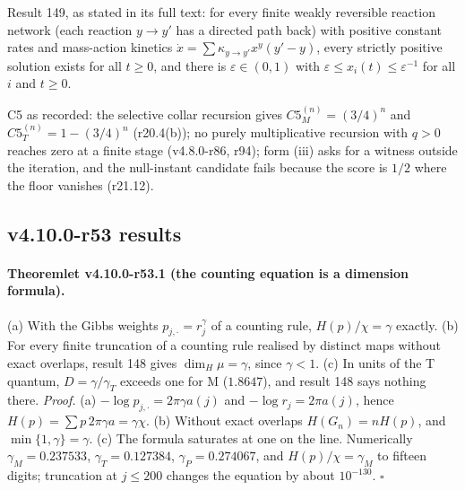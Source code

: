Result 149, as stated in its full text: for every finite weakly reversible reaction network (each reaction \(y\to y'\) has a directed path back) with
positive constant rates and mass-action kinetics \(\dot x=\sum\kappa_{y\to y'}x^y(y'-y)\), every strictly positive solution exists for all \(t\ge0\), and there
is \(\varepsilon\in(0,1)\) with \(\varepsilon\le x_i(t)\le\varepsilon^{-1}\) for all \(i\) and \(t\ge0\).

C5 as recorded: the selective collar recursion gives \(C5_M^{(n)}=(3/4)^n\) and \(C5_T^{(n)}=1-(3/4)^n\) (r20.4(b)); no purely multiplicative recursion
with \(q>0\) reaches zero at a finite stage (v4.8.0-r86, r94); form (iii) asks for a witness outside the iteration, and the null-instant candidate
fails because the score is \(1/2\) where the floor vanishes (r21.12).

\subsection*{v4.10.0-r53 results}
\label{subsec:v4100-r53-results}

\paragraph{Theoremlet v4.10.0-r53.1 (the counting equation is a dimension formula).}
(a) With the Gibbs weights \(p_{j,\cdot}=r_j^{\gamma}\) of a counting rule, \(H(p)/\chi=\gamma\) exactly.  (b) For every finite truncation of a counting
rule realised by distinct maps without exact overlaps, result 148 gives \(\dim_H\mu=\gamma\), since \(\gamma<1\).  (c) In units of the T quantum,
\(D=\gamma/\gamma_T\) exceeds one for M (\(1.8647\)), and result 148 says nothing there.
\emph{Proof.} (a) \(-\log p_{j,\cdot}=2\pi\gamma a(j)\) and \(-\log r_j=2\pi a(j)\), hence \(H(p)=\sum p\,2\pi\gamma a=\gamma\chi\).  (b) Without exact overlaps
\(H(G_n)=nH(p)\), and \(\min\{1,\gamma\}=\gamma\).  (c) The formula saturates at one on the line.  Numerically \(\gamma_M=0.237533\), \(\gamma_T=0.127384\),
\(\gamma_P=0.274067\), and \(H(p)/\chi=\gamma_M\) to fifteen digits; truncation at \(j\le200\) changes the equation by about \(10^{-130}\).  \(\square\)

